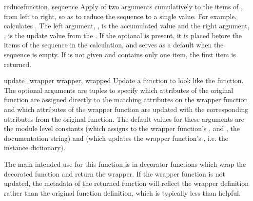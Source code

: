 \begin{funcdesc}{reduce}{function, sequence}
  Apply  of two arguments cumulatively to the items of
  , from left to right, so as to reduce the sequence to
  a single value.  For example,  calculates .  The left argument,
  , is the accumulated value and the right argument, ,
  is the update value from the .  If the optional
   is present, it is placed before the items of the
  sequence in the calculation, and serves as a default when the
  sequence is empty.  If  is not given and
   contains only one item, the first item is returned.
\end{funcdesc}

\begin{funcdesc}{update_wrapper}
{wrapper, wrapped}
Update a  function to look like the  function.
The optional arguments are tuples to specify which attributes of the original
function are assigned directly to the matching attributes on the wrapper
function and which attributes of the wrapper function are updated with
the corresponding attributes from the original function. The default
values for these arguments are the module level constants
 (which assigns to the wrapper function's
,  and , the documentation string)
and  (which updates the wrapper function's ,
i.e. the instance dictionary).

The main intended use for this function is in decorator functions
which wrap the decorated function and return the wrapper. If the
wrapper function is not updated, the metadata of the returned function
will reflect the wrapper definition rather than the original function
definition, which is typically less than helpful.
\end{funcdesc}


